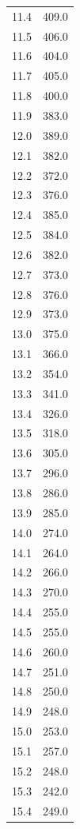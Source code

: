 \begin{minipage}{\linewidth}
\begin{table}[H]
\begin{tabular}{ll}
        11.4&		409.0 \\
        11.5&		406.0 \\
        11.6&		404.0 \\
        11.7&		405.0 \\
        11.8&		400.0 \\
        11.9&		383.0 \\
        12.0&		389.0 \\
        12.1&		382.0 \\
        12.2&		372.0 \\
        12.3&		376.0 \\
        12.4&		385.0 \\
        12.5&		384.0 \\
        12.6&		382.0 \\
        12.7&		373.0 \\
        12.8&		376.0 \\
        12.9&		373.0 \\
        13.0&		375.0 \\
        13.1&		366.0 \\
        13.2&		354.0 \\
        13.3&		341.0 \\
        13.4&		326.0 \\
        13.5&		318.0 \\
        13.6&		305.0 \\
        13.7&		296.0 \\
        13.8&		286.0 \\
        13.9&		285.0 \\
        14.0&		274.0 \\
        14.1&		264.0 \\
        14.2&		266.0 \\
        14.3&		270.0 \\
        14.4&		255.0 \\
        14.5&		255.0 \\
        14.6&		260.0 \\
        14.7&		251.0 \\
        14.8&		250.0 \\
        14.9&		248.0 \\
        15.0&		253.0 \\
        15.1&		257.0 \\
        15.2&		248.0 \\
        15.3&		242.0 \\
        15.4&		249.0 \\

\end{tabular}
\end{table}
\end{minipage}
